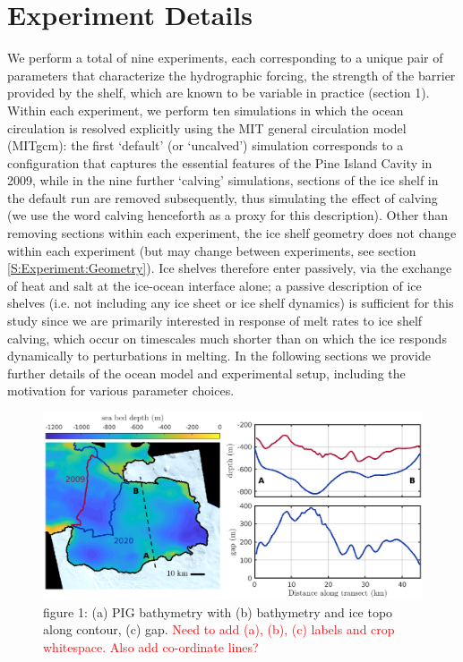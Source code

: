 \documentclass[draft]{agujournal2019}
\newcommand{\red}[1]{\textcolor{red}{#1}}
\begin{document}
\section{Experiment Details}
We perform a total of nine experiments, each corresponding to a unique pair of parameters that characterize the hydrographic forcing, the strength of the barrier provided by the shelf, which are known to be variable in practice (section 1). Within each experiment, we perform ten simulations in which the ocean circulation is resolved explicitly using the MIT general circulation model (MITgcm): the first `default' (or `uncalved') simulation  corresponds to a configuration that captures the essential features of the Pine Island Cavity in 2009, while in the nine further `calving' simulations, sections of the ice shelf in the default run are removed subsequently, thus simulating the effect of calving (we use the word calving henceforth as a proxy for this description). Other than removing sections within each experiment, the ice shelf geometry does not change within each experiment (but may change between experiments, see section \ref{S:Experiment:Geometry}). Ice shelves therefore enter passively, via the exchange of heat and salt at the ice-ocean interface alone; a passive description of ice shelves (i.e. not including any ice sheet or ice shelf dynamics) is sufficient for this study since we are primarily interested in response of melt rates to ice shelf calving, which occur on timescales much shorter than on which the ice responds dynamically to perturbations in melting. In the following sections we provide further details of the ocean model and experimental setup, including the motivation for various parameter choices.
\begin{figure}
    \centering
    \includegraphics[width = \textwidth]{../make_figures/plots/figure1.eps}
    \caption{figure 1: (a) PIG bathymetry with (b) bathymetry and ice topo along contour, (c) gap. \red{Need to add (a), (b), (c) labels and crop whitespace. Also add co-ordinate lines?}}
    \label{fig:my_label}
\end{figure}
\end{document}
